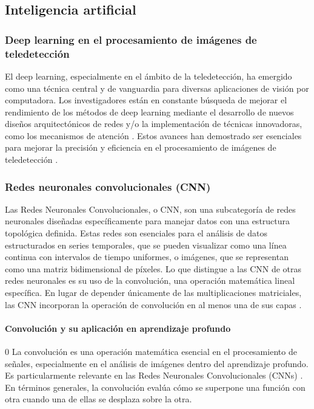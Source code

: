        \subsection{Inteligencia artificial}            
            \subsubsection{Deep learning en el procesamiento de imágenes de teledetección}
                El deep learning, especialmente en el ámbito de la teledetección, ha emergido como una técnica central y de vanguardia para diversas aplicaciones de visión por computadora. Los investigadores están en constante búsqueda de mejorar el rendimiento de los métodos de deep learning mediante el desarrollo de nuevos diseños arquitectónicos de redes y/o la implementación de técnicas innovadoras, como los mecanismos de atención \autocite{ghaffarian2021effect}. Estos avances han demostrado ser esenciales para mejorar la precisión y eficiencia en el procesamiento de imágenes de teledetección \autocite{wang2022review}.
                
            \subsubsection{Redes neuronales convolucionales (CNN)}
                Las Redes Neuronales Convolucionales, o CNN, son una subcategoría de redes neuronales diseñadas específicamente para manejar datos con una estructura topológica definida. Estas redes son esenciales para el análisis de datos estructurados en series temporales, que se pueden visualizar como una línea continua con intervalos de tiempo uniformes, o imágenes, que se representan como una matriz bidimensional de píxeles. Lo que distingue a las CNN de otras redes neuronales es su uso de la convolución, una operación matemática lineal específica. En lugar de depender únicamente de las multiplicaciones matriciales, las CNN incorporan la operación de convolución en al menos una de sus capas 
                \autocite{Goodfellow2016}.

                \paragraph{Convolución y su aplicación en aprendizaje profundo}0
                    La convolución es una operación matemática esencial en el procesamiento de señales, especialmente en el análisis de imágenes dentro del aprendizaje profundo. Es particularmente relevante en las Redes Neuronales Convolucionales (CNNs) \autocite{Goodfellow2016}. En términos generales, la convolución evalúa cómo se superpone una función con otra cuando una de ellas se desplaza sobre la otra.
                    
